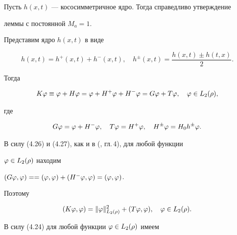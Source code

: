 \begin{cornonum}


Пусть $h(x,t)$ --- кососимметричное ядро. Тогда справедливо утверждение 


леммы с постоянной $M_a=1$.


\end{cornonum}








\begin{pf}


Представим ядро $h(x,t)$ в виде


$$


h(x,t)=h^+(x,t)+h^{-}(x,t),\quad h^{\pm}(x,t)=\frac{h(x,t)\pm h(t,x)}{2}.


$$


Тогда


\begin{equation}


K\vp \equiv \vp+H\vp=\vp+H^+\vp+H^-\vp=G\vp+T\vp,\quad \vp\in L_2(\rho),


\end{equation}


где


\begin{equation}


G\vp=\vp+H^-\vp,\quad T\vp=H^+\vp,\quad H^{\pm}\vp=H_0h^{\pm}\vp.


\end{equation}





В силу (4.26) и (4.27), как и в (\cite{5}, гл.\,4), для любой функции 


$\varphi\in L_2(\rho)$ находим


$(G\vp,\vp)=\linebreak = (\vp,\vp)+(H^{-}\vp,\vp)=(\vp,\vp)$.




Поэтому


\begin{equation}


(K\vp,\vp)=\|\vp\|^2_{L_2(\rho)}+(T\vp,\vp),\quad \vp\in L_2(\rho).


\end{equation}





В силу (4.24) для любой функции $\varphi\in L_2(\rho)$ имеем



\end{pf}
